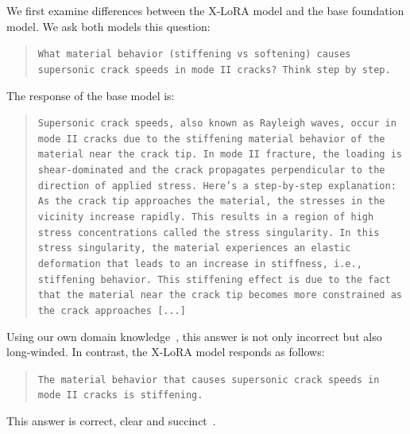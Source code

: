 We first examine differences between the X-LoRA model and the base foundation model. We ask both models this question:
\begin{quote}
\small\texttt{What material behavior (stiffening vs softening) causes supersonic crack speeds in mode II cracks? Think step by step.}
\end{quote}

The response of the base model is:
\begin{quote}
\small\texttt{Supersonic crack speeds, also known as Rayleigh waves, occur in mode II cracks due to the stiffening material behavior of the material near the crack tip. In mode II fracture, the loading is shear-dominated and the crack propagates perpendicular to the direction of applied stress.
Here's a step-by-step explanation:
\newline\newline
As the crack tip approaches the material, the stresses in the vicinity increase rapidly. This results in a region of high stress concentrations called the stress singularity.
\newline\newline
In this stress singularity, the material experiences an elastic deformation that leads to an increase in stiffness, i.e., stiffening behavior. This stiffening effect is due to the fact that the material near the crack tip becomes more constrained as the crack approaches [...]}
\end{quote}
Using our own domain knowledge~\cite{Buehler2008AtomisticFailure}, this answer is not only incorrect but also long-winded. In contrast, the X-LoRA model responds as follows:
\begin{quote}
\small\texttt{The material behavior that causes supersonic crack speeds in mode II cracks is stiffening.}
\end{quote}
This answer is correct, clear and succinct~\cite{Buehler2008AtomisticFailure}. 

